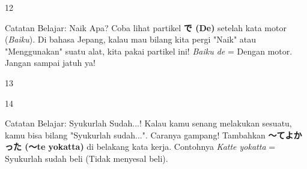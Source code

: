 \begin{convobox}{12}
    \noindent
      
      
     

    \vspace{1.5em}
\end{convobox}

\begin{lessonbox}{Catatan Belajar: Naik Apa?}
    Coba lihat partikel \textbf{で (De)} setelah kata motor (\textit{Baiku}). Di bahasa Jepang, kalau mau bilang kita pergi "Naik" atau "Menggunakan" suatu alat, kita pakai partikel ini! \textit{Baiku de} = Dengan motor. Jangan sampai jatuh ya!
\end{lessonbox}

\begin{convobox}{13}
    \noindent
     

    \vspace{1.5em}
\end{convobox}

\begin{convobox}{14}
    \noindent
      
     

    \vspace{1.5em}
\end{convobox}

\begin{lessonbox}{Catatan Belajar: Syukurlah Sudah...!}
    Kalau kamu senang melakukan sesuatu, kamu bisa bilang "Syukurlah sudah...". Caranya gampang! Tambahkan \textbf{〜てよかった (〜te yokatta)} di belakang kata kerja. Contohnya \textit{Katte yokatta} = Syukurlah sudah beli (Tidak menyesal beli).
\end{lessonbox}

